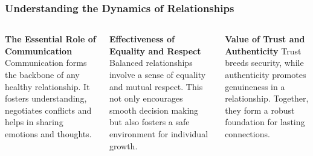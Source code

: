 \documentclass[5pt]{beamer}
\begin{document}
\begin{frame}
\frametitle{Understanding the Dynamics of Relationships}
\begin{columns}
\begin{column}{0.3\textwidth}
\begin{block}{\textbf{The Essential Role of Communication}}
Communication forms the backbone of any healthy relationship. It fosters understanding, negotiates conflicts and helps in sharing emotions and thoughts.
\end{block}
\end{column}
\begin{column}{0.3\textwidth}
\begin{block}{\textbf{Effectiveness of Equality and Respect}}
Balanced relationships involve a sense of equality and mutual respect. This not only encourages smooth decision making but also fosters a safe environment for individual growth.
\end{block}
\end{column}
\begin{column}{0.3\textwidth}
\begin{block}{\textbf{Value of Trust and Authenticity}}
Trust breeds security, while authenticity promotes genuineness in a relationship. Together, they form a robust foundation for lasting connections.
\end{block}
\end{column}
\end{columns}
\end{frame}
\end{document}
